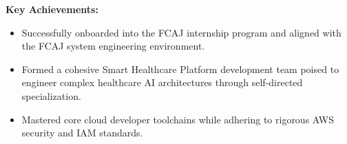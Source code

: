 \vspace{0.5em}\noindent\textbf{Key Achievements:}

\begin{itemize}
\tightlist
\item
  Successfully onboarded into the FCAJ internship program and aligned
  with the FCAJ system engineering environment.
\item
  Formed a cohesive Smart Healthcare Platform development team poised to
  engineer complex healthcare AI architectures through self-directed
  specialization.
\item
  Mastered core cloud developer toolchains while adhering to rigorous
  AWS security and IAM standards.
\end{itemize}
